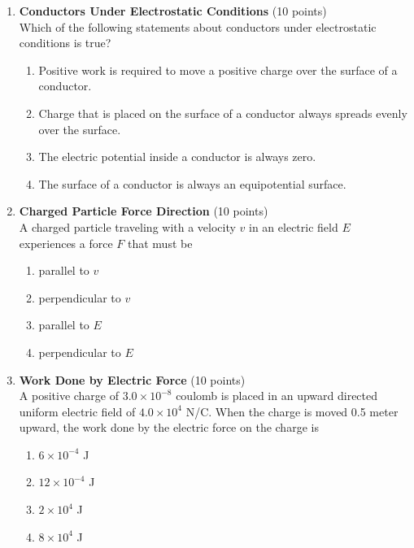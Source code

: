 \begin{enumerate}
  \item \textbf{Conductors Under Electrostatic Conditions} (10 points)\\
  Which of the following statements about conductors under electrostatic conditions is true?
  \begin{enumerate}[label=(\Alph*)]
    \item Positive work is required to move a positive charge over the surface of a conductor.
    \item Charge that is placed on the surface of a conductor always spreads evenly over the surface.
    \item The electric potential inside a conductor is always zero.
    \item The surface of a conductor is always an equipotential surface.
  \end{enumerate}
  \begin{subanswer}
  \end{subanswer}

  \item \textbf{Charged Particle Force Direction} (10 points)\\
  A charged particle traveling with a velocity $v$ in an electric field $E$ experiences a force $F$ that must be
  \begin{enumerate}[label=(\Alph*)]
    \item parallel to $v$
    \item perpendicular to $v$
    \item parallel to $E$
    \item perpendicular to $E$
  \end{enumerate}
  \begin{subanswer}
  \end{subanswer}

  \item \textbf{Work Done by Electric Force} (10 points)\\
  A positive charge of $3.0 \times 10^{-8}$ coulomb is placed in an upward directed uniform electric field of $4.0 \times 10^4$ N/C. When the charge is moved 0.5 meter upward, the work done by the electric force on the charge is
  \begin{enumerate}[label=(\Alph*)]
    \item $6 \times 10^{-4}$ J
    \item $12 \times 10^{-4}$ J
    \item $2 \times 10^4$ J
    \item $8 \times 10^4$ J
  \end{enumerate}
  \begin{subanswer}
  \end{subanswer}


\end{enumerate}
